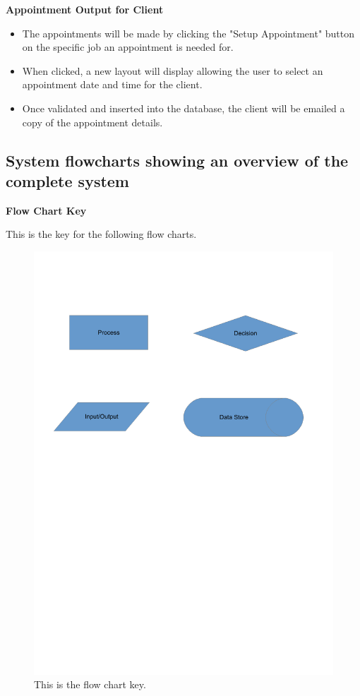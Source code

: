 \textbf{Appointment Output for Client}

	\begin{itemize}
		\item The appointments will be made by clicking the "Setup Appointment" button on the specific job an appointment is needed for.
		\item When clicked, a new layout will display allowing the user to select an appointment date and time for the client.
		\item Once validated and inserted into the database, the client will be emailed a copy of the appointment details.
	\end{itemize}


\pagebreak
\subsection{System flowcharts showing an overview of the complete system}
\textbf{Flow Chart Key}
\begin{flushleft}
This is the key for the following flow charts.
\end{flushleft}
\begin{figure}[H]
    \includegraphics[scale=0.4]{./Design/images/key.pdf}
    \caption{This is the flow chart key.} \label{fig:FlowChartKey}
\end{figure}


